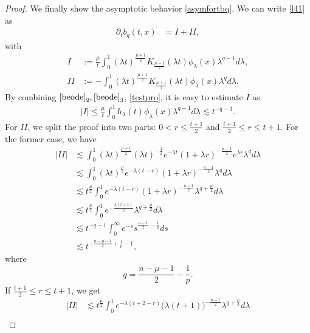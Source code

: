 \documentclass[review]{elsarticle}
\newtheorem{proof}{Proof}[section]
\begin{document}
\begin{proof}
We finally show the asymptotic behavior \eqref{asymfortbq}. We can write \eqref{l41} as
\begin{equation}\label{l45}
\begin{aligned}
\partial_tb_q(t,x)&=I+II,
\end{aligned}
\end{equation}
with
\[
\begin{aligned}
I&:=\frac{\mu}{t}\int_{0}^{1}(\lambda t)^{\frac{\mu+1}{2}}K_{\frac{\mu-1}{2}}(\lambda t)\phi_\lambda(x)\lambda^{q-1}d\lambda,\\
II&:=-\int_{0}^{1}(\lambda t)^{\frac{\mu+1}{2}}K_{\frac{\mu+1}{2}}(\lambda t)\phi_\lambda(x)\lambda^{q}d\lambda.
\end{aligned}
\]
By combining $\eqref{beode}_2, \eqref{beode}_3$, \eqref{testpro}, it is easy to estimate $I$ as
\begin{equation}
\begin{aligned}
|I|\leq \frac{\mu}{t}\int_{0}^{1}h_\lambda(t)\phi_\lambda(x)\lambda^{q-1}d\lambda\lesssim t^{-q-1}.
\end{aligned}
\end{equation}
For $II$, we split the proof into two parts: $0<r\leq\frac{t+1}{2}$ and $\frac{t+1}{2}\leq r \leq t+1$. For the former case, we have
\begin{equation}
\begin{aligned}
|II|&\lesssim \int_{0}^{1}(\lambda t)^{\frac{\mu+1}{2}}(\lambda t)^{-\frac{1}{2}}e^{-\lambda t}(1+\lambda r)^{-\frac{n-1}{2}}e^{\lambda r}\lambda^{q}d\lambda\\
&\lesssim \int_{0}^{1}(\lambda t)^{\frac{\mu}{2}}e^{-\lambda(t-r)}(1+\lambda r)^{-\frac{n-1}{2}}\lambda^{q}d\lambda\\
&\lesssim t^{\frac{\mu}{2}}\int_{0}^{1}e^{-\lambda(t-r)}(1+\lambda r)^{-\frac{n-1}{2}}\lambda^{q+\frac{\mu}{2}}d\lambda\\
&\lesssim t^{\frac{\mu}{2}}\int_{0}^{1}e^{-\frac{\lambda(t+1)}{2}}\lambda^{q+\frac{\mu}{2}}d\lambda\\
&\lesssim t^{-q-1}\int_{0}^{\infty}e^{-s}s^{\frac{n-1}{2}-\frac{1}{p}}ds\\
&\lesssim t^{-\frac{n-\mu-1}{2}+\frac{1}{p}-1},
\end{aligned}
\end{equation}
where
\[
q=\frac{n-\mu-1}{2}-\frac{1}{p}.
\]
If $\frac{t+1}{2}\leq r \leq t+1$, we get
\begin{equation}
\begin{aligned}
|II|&\lesssim t^{\frac{\mu}{2}}\int_{0}^{1}e^{-\lambda(t+2-r)}\big(\lambda (t+1)\big)^{-\frac{n-1}{2}}\lambda^{q+\frac{\mu}{2}}d\lambda\\

\end{aligned}
\end{equation}
\end{proof}
\end{document}
